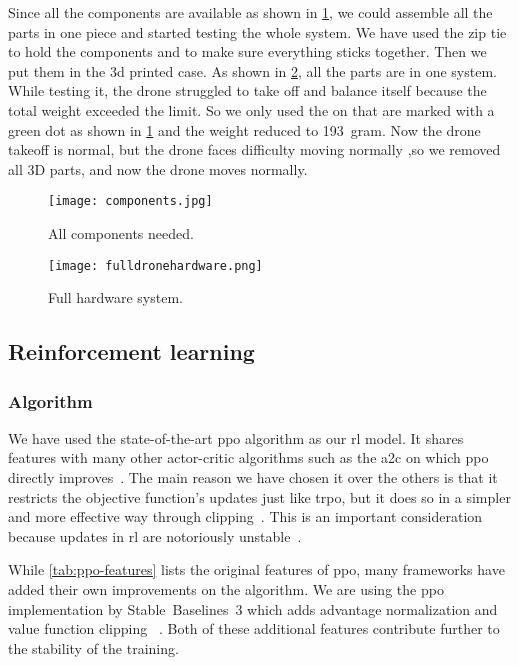 \documentclass[../main.tex]{subfiles}
\begin{document}
Since all the components are available as shown 
in \cref{fig:components}, we could assemble 
all the parts in one piece and started testing the whole system.
We have used the zip tie to hold the components and to
make sure everything sticks together. Then we put them in the 3d
printed case. As shown in 
\cref{fig:full-hardware}, all the parts are in one system. 
While testing it, the drone struggled to take off and balance itself
because the total weight exceeded the limit. So we
only used the on that are marked with a green dot 
as shown in \cref{fig:components} and the weight reduced to \SI{193}{gram}. 
Now the drone takeoff is normal, but the drone faces difficulty moving normally ,so we removed all 3D parts, and now the drone moves normally.


\begin{figure}[p]
	\centering
	\texttt{[image: components.jpg]}
	\caption{All components needed.}
	\label{fig:components}
\end{figure}

\begin{figure}[h]
	\centering
	\texttt{[image: fulldronehardware.png]}
	\caption{Full hardware system.}
	\label{fig:full-hardware}
\end{figure}  



\subsection{Reinforcement learning}

\subsubsection{Algorithm}

We have used the state-of-the-art \gls{ppo} algorithm as our \gls{rl}
model. 
It shares features with many other actor-critic algorithms such
as the \gls{a2c} on which \gls{ppo} directly improves~\cite{ppo}.
The main reason we have chosen it over the others is that it restricts
the objective function's updates just like \gls{trpo}, but it does so
in a simpler and more effective way through clipping~\cite{ppo}.
This is an important consideration because updates in \gls{rl} are
notoriously unstable~\cite{Hen18}. 

While \cref{tab:ppo-features} lists the original features of \gls{ppo},
many frameworks have added their own improvements on the algorithm.
We are using the \gls{ppo} implementation by Stable~Baselines~3
which adds advantage normalization and value function clipping%
~\cite{sb3}.
Both of these additional features contribute further to the stability
of the training.
\end{document}
